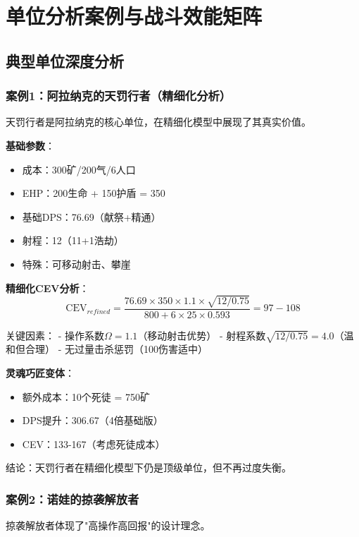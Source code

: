 \documentclass[a4paper,12pt]{article}
\begin{document}
\section{单位分析案例与战斗效能矩阵}

\subsection{典型单位深度分析}

\subsubsection{案例1：阿拉纳克的天罚行者（精细化分析）}
天罚行者是阿拉纳克的核心单位，在精细化模型中展现了其真实价值。

\textbf{基础参数}：
\begin{itemize}
\item 成本：300矿/200气/6人口
\item EHP：200生命 + 150护盾 = 350
\item 基础DPS：76.69（献祭+精通）
\item 射程：12（11+1浩劫）
\item 特殊：可移动射击、攀崖
\end{itemize}

\textbf{精细化CEV分析}：
\begin{equation}
\text{CEV}_{refined} = \frac{76.69 \times 350 \times 1.1 \times \sqrt{12/0.75}}{800 + 6 \times 25 \times 0.593} = 97-108
\end{equation}

关键因素：
- 操作系数$\Omega = 1.1$（移动射击优势）
- 射程系数$\sqrt{12/0.75} = 4.0$（温和但合理）
- 无过量击杀惩罚（100伤害适中）

\textbf{灵魂巧匠变体}：
\begin{itemize}
\item 额外成本：10个死徒 = 750矿
\item DPS提升：306.67（4倍基础版）
\item CEV：133-167（考虑死徒成本）
\end{itemize}

结论：天罚行者在精细化模型下仍是顶级单位，但不再过度失衡。

\subsubsection{案例2：诺娃的掠袭解放者}
掠袭解放者体现了"高操作高回报"的设计理念。
\end{document}
